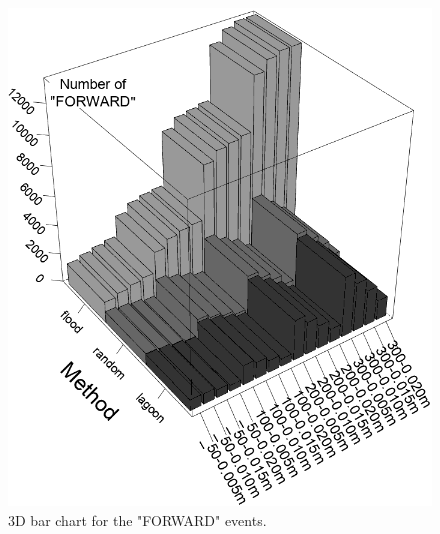 \documentclass[12pt, oneandhalf, chaparabic, sees, ms]{metu}
\begin{document}
\begin{minipage}[t]{0.57\textwidth}
\begin{figure}[H]
\begin{center}
  \includegraphics[width=\textwidth]{3dforwards2.png}
   \end{center}
  \caption{3D bar chart for the "FORWARD" events.}
 \label{fig:forwards3d}
\end{figure}
\end{minipage}
\end{document}
